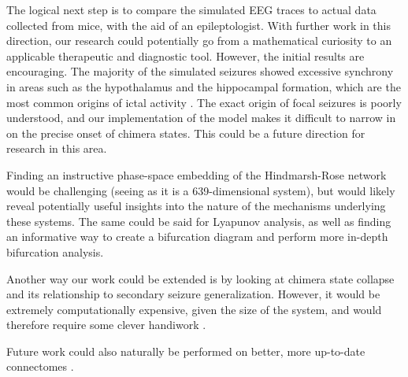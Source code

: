 The logical next step is to compare the simulated EEG traces to actual data collected from mice, with the aid of an epileptologist.
With further work in this direction, our research could potentially go from a mathematical curiosity to an applicable therapeutic and diagnostic tool.
However, the initial results are encouraging.
The majority of the simulated seizures showed excessive synchrony in areas such as the hypothalamus and the hippocampal formation, which are the most common origins of ictal activity \cite{Maguire2013,Avoli2007}.
The exact origin of focal seizures is poorly understood, and our implementation of the model makes it difficult to narrow in on the precise onset of chimera states.
This could be a future direction for research in this area.

Finding an instructive phase-space embedding of the Hindmarsh-Rose network would be challenging (seeing as it is a 639-dimensional system),
but would likely reveal potentially useful insights into the nature of the mechanisms underlying these systems.
The same could be said for Lyapunov analysis, as well as finding an informative way to create a bifurcation diagram and perform more in-depth bifurcation analysis.

Another way our work could be extended is by looking at chimera state collapse and its relationship to secondary seizure generalization.
However, it would be extremely computationally expensive, given the size of the system, and would therefore require some clever handiwork \cite{Wolfrum2011}.

Future work could also naturally be performed on better, more up-to-date connectomes \cite{Knox2019}.

